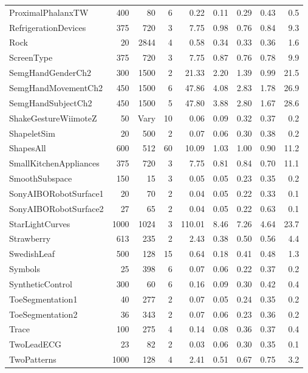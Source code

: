 \documentclass[11pt,landscape]{article}
\begin{document}
\begin{longtable}{lrrrrrrrr}
ProximalPhalanxTW & 400 & 80 & 6 & 0.22 & 0.11 & 0.29 & 0.43 & 0.5 \\
RefrigerationDevices & 375 & 720 & 3 & 7.75 & 0.98 & 0.76 & 0.84 & 9.3 \\
Rock & 20 & 2844 & 4 & 0.58 & 0.34 & 0.33 & 0.36 & 1.6 \\
ScreenType & 375 & 720 & 3 & 7.75 & 0.87 & 0.76 & 0.78 & 9.9 \\
\rowcolor{fastrow}SemgHandGenderCh2 & 300 & 1500 & 2 & 21.33 & 2.20 & 1.39 & 0.99 & 21.5 \\
\rowcolor{fastrow}SemgHandMovementCh2 & 450 & 1500 & 6 & 47.86 & 4.08 & 2.83 & 1.78 & 26.9 \\
\rowcolor{fastrow}SemgHandSubjectCh2 & 450 & 1500 & 5 & 47.80 & 3.88 & 2.80 & 1.67 & 28.6 \\
ShakeGestureWiimoteZ & 50 & Vary & 10 & 0.06 & 0.09 & 0.32 & 0.37 & 0.2 \\
ShapeletSim & 20 & 500 & 2 & 0.07 & 0.06 & 0.30 & 0.38 & 0.2 \\
\rowcolor{fastrow}ShapesAll & 600 & 512 & 60 & 10.09 & 1.03 & 1.00 & 0.90 & 11.2 \\
SmallKitchenAppliances & 375 & 720 & 3 & 7.75 & 0.81 & 0.84 & 0.70 & 11.1 \\
SmoothSubspace & 150 & 15 & 3 & 0.05 & 0.05 & 0.23 & 0.35 & 0.2 \\
SonyAIBORobotSurface1 & 20 & 70 & 2 & 0.04 & 0.05 & 0.22 & 0.33 & 0.1 \\
SonyAIBORobotSurface2 & 27 & 65 & 2 & 0.04 & 0.05 & 0.22 & 0.63 & 0.1 \\
\rowcolor{fastrow}StarLightCurves & 1000 & 1024 & 3 & 110.01 & 8.46 & 7.26 & 4.64 & 23.7 \\
Strawberry & 613 & 235 & 2 & 2.43 & 0.38 & 0.50 & 0.56 & 4.4 \\
SwedishLeaf & 500 & 128 & 15 & 0.64 & 0.18 & 0.41 & 0.48 & 1.3 \\
Symbols & 25 & 398 & 6 & 0.07 & 0.06 & 0.22 & 0.37 & 0.2 \\
SyntheticControl & 300 & 60 & 6 & 0.16 & 0.09 & 0.30 & 0.42 & 0.4 \\
ToeSegmentation1 & 40 & 277 & 2 & 0.07 & 0.05 & 0.24 & 0.35 & 0.2 \\
ToeSegmentation2 & 36 & 343 & 2 & 0.07 & 0.06 & 0.23 & 0.36 & 0.2 \\
Trace & 100 & 275 & 4 & 0.14 & 0.08 & 0.36 & 0.37 & 0.4 \\
TwoLeadECG & 23 & 82 & 2 & 0.03 & 0.06 & 0.30 & 0.35 & 0.1 \\
TwoPatterns & 1000 & 128 & 4 & 2.41 & 0.51 & 0.67 & 0.75 & 3.2 \\

\end{longtable}
\end{document}

